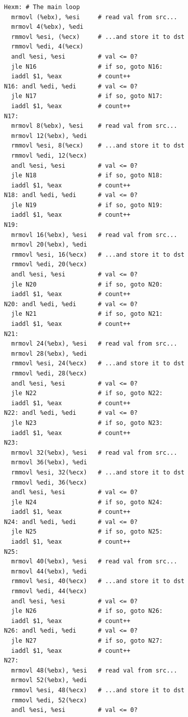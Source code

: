 \documentclass{article}
\begin{document}
\begin{itemize}
\begin{lstlisting}
Hexm: # The main loop
  mrmovl (%ebx), %esi     # read val from src...
  mrmovl 4(%ebx), %edi
  rmmovl %esi, (%ecx)     # ...and store it to dst
  rmmovl %edi, 4(%ecx)  
  andl %esi, %esi         # val <= 0?  
  jle N16                 # if so, goto N16:
  iaddl $1, %eax          # count++
N16: andl %edi, %edi      # val <= 0?  
  jle N17                 # if so, goto N17:
  iaddl $1, %eax          # count++
N17:
  mrmovl 8(%ebx), %esi    # read val from src...
  mrmovl 12(%ebx), %edi
  rmmovl %esi, 8(%ecx)    # ...and store it to dst
  rmmovl %edi, 12(%ecx)  
  andl %esi, %esi         # val <= 0?  
  jle N18                 # if so, goto N18:
  iaddl $1, %eax          # count++
N18: andl %edi, %edi      # val <= 0?  
  jle N19                 # if so, goto N19:
  iaddl $1, %eax          # count++
N19:
  mrmovl 16(%ebx), %esi   # read val from src...
  mrmovl 20(%ebx), %edi
  rmmovl %esi, 16(%ecx)   # ...and store it to dst  
  rmmovl %edi, 20(%ecx)  
  andl %esi, %esi         # val <= 0?  
  jle N20                 # if so, goto N20:
  iaddl $1, %eax          # count++
N20: andl %edi, %edi      # val <= 0?  
  jle N21                 # if so, goto N21:
  iaddl $1, %eax          # count++
N21:
  mrmovl 24(%ebx), %esi   # read val from src...
  mrmovl 28(%ebx), %edi
  rmmovl %esi, 24(%ecx)   # ...and store it to dst    
  rmmovl %edi, 28(%ecx)  
  andl %esi, %esi         # val <= 0?  
  jle N22                 # if so, goto N22:
  iaddl $1, %eax          # count++
N22: andl %edi, %edi      # val <= 0?  
  jle N23                 # if so, goto N23:
  iaddl $1, %eax          # count++
N23:
  mrmovl 32(%ebx), %esi   # read val from src...
  mrmovl 36(%ebx), %edi
  rmmovl %esi, 32(%ecx)   # ...and store it to dst    
  rmmovl %edi, 36(%ecx)  
  andl %esi, %esi         # val <= 0?  
  jle N24                 # if so, goto N24:
  iaddl $1, %eax          # count++
N24: andl %edi, %edi      # val <= 0?  
  jle N25                 # if so, goto N25:
  iaddl $1, %eax          # count++
N25:
  mrmovl 40(%ebx), %esi   # read val from src...
  mrmovl 44(%ebx), %edi
  rmmovl %esi, 40(%ecx)   # ...and store it to dst    
  rmmovl %edi, 44(%ecx)  
  andl %esi, %esi         # val <= 0?  
  jle N26                 # if so, goto N26:
  iaddl $1, %eax          # count++
N26: andl %edi, %edi      # val <= 0?  
  jle N27                 # if so, goto N27:
  iaddl $1, %eax          # count++
N27:
  mrmovl 48(%ebx), %esi   # read val from src...
  mrmovl 52(%ebx), %edi
  rmmovl %esi, 48(%ecx)   # ...and store it to dst    
  rmmovl %edi, 52(%ecx)  
  andl %esi, %esi         # val <= 0?  

\end{lstlisting}
\end{itemize}
\end{document}
